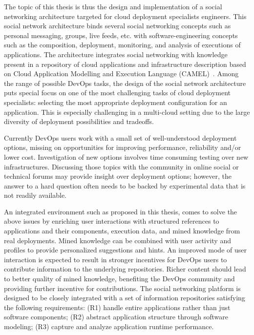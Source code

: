 The topic of this thesis is thus the design and implementation of a social networking architecture targeted for cloud deployment specialists engineers.
This social network architecture binds several social networking concepts such as personal messaging, groups, live feeds, etc. with software-engineering concepts such as the composition, deployment, monitoring, and analysis of executions of applications.  The architecture integrates social networking with knowledge present in a repository of cloud applications and infrastructure description based on Cloud Application Modelling and Execution Language (CAMEL)~\cite{paasagedeliverable212}. 
Among the range of possible DevOps tasks, the design of the social network architecture puts special focus on one of the most challenging tasks of cloud deployment specialists: selecting the most appropriate deployment configuration for an application. This is especially challenging in a multi-cloud setting due to the large diversity of deployment possibilities and tradeoffs. 

Currently DevOps users work with a small set of well-understood deployment options, missing on opportunities for improving performance, reliability and/or lower cost. Investigation of new options involves time consuming testing over new infrastructures. Discussing those topics with the community in online social or technical forums may provide insight over deployment options; however, the answer to a hard question often needs to be backed by experimental data that is not readily available. 

An integrated environment such as proposed in this thesis, comes to solve the above issues by enriching user interactions with structured references to applications and their components, execution data, and mined knowledge from real deployments. Mined knowledge can be combined with user activity and profiles to provide personalized suggestions and hints.  An improved mode of user interaction is expected to result in stronger incentives for DevOps users to contribute information to the underlying repositories. Richer content should lead to better quality of mined knowledge, benefiting the DevOps community and providing further incentive for contributions.  The social networking platform is designed to be closely integrated with a set of information repositories satisfying the following requirements: 
(R1) handle entire applications rather than just software components; (R2) abstract application structure through software modeling; (R3) capture and analyze application runtime performance. 

